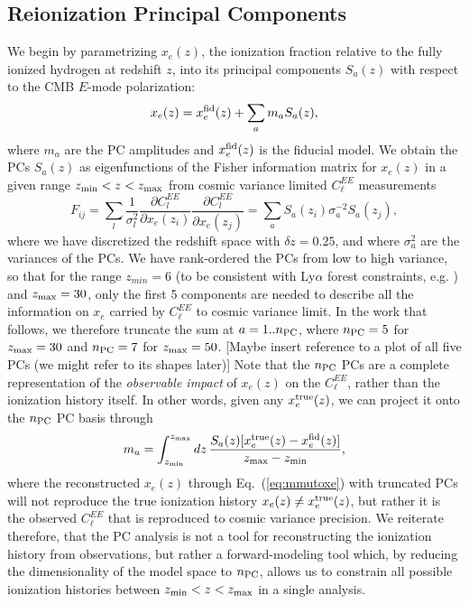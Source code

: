 \documentclass[prd,twocolumn,amsmath,amssymb,floatfix,superscriptaddress,nofootinbib]{revtex4-1}
\newcommand{\xef}{x_e^{\rm fid}}
\newcommand{\zmax}{z_{\rm max}}
\newcommand{\zmin}{z_{\rm min}}
\newcommand{\beq}{\begin{equation}}
\newcommand{\eeq}{\end{equation}}
\begin{document}
\subsection{Reionization Principal Components}
\label{sec:PC}
We begin by parametrizing $x_e(z)$, the ionization fraction relative to the fully ionized hydrogen at redshift $z$, into its principal components $S_{a}(z)$ with respect to the CMB $E$-mode polarization:
%
\begin{equation}
x_e(z)=\xef(z)+\sum_{a}m_{a}S_{a}(z),
\label{eq:mmutoxe}
\end{equation}
%
where $m_a$ are the PC amplitudes and $\xef(z)$ is the fiducial model. We obtain the PCs $S_{a}(z)$ as eigenfunctions of the Fisher information matrix for $x_e(z)$ in a given range $z_{\rm min}<z<z_{\rm max}$ from cosmic variance limited $C_\ell^{EE}$ measurements 
%
\beq
F_{ij} = \sum_l \frac{1}{\sigma_l^2} \frac{\partial C_l^{EE}}{\partial x_e(z_i)}\frac{\partial C_l^{EE}}{\partial x_e(z_j)} = \sum_a S_a(z_i) \sigma_a^{-2} S_a(z_j),
\eeq
%
where we have discretized the redshift space with $\delta z= 0.25$, and where $\sigma_a^2$ are the variances of the PCs. We have rank-ordered the PCs from low to high variance, so that for the range $z_{min} = 6$ (to be consistent with Ly$\alpha$ forest constraints, e.g. \cite{Becker:2015lua}) and $z_{\rm max} = 30$, only the first 5 components are needed to describe all the information on $x_e$ carried by $C_\ell^{EE}$ to cosmic variance limit. In the work that follows, we therefore truncate the sum at $a = 1 .. n_{\rm{PC}}$, where $n_{\rm{PC}} = 5$ for $z_{\rm max} = 30$ and $n_{\rm{PC}} = 7$ for $z_{\rm max} = 50$.
[Maybe insert reference to a plot of all five PCs (we might refer to its shapes later)]
Note that the $n_{\rm PC}$ PCs are a complete representation of the \textit{observable impact} of $x_e(z)$ on the $C_\ell^{EE}$, rather than the ionization history itself. In other words, 
given any $x_e^{\rm true}(z)$, we can project it onto the $n_{\rm PC}$ PC basis through
\begin{equation}
m_{a}=
  \int _{\zmin}^{\zmax} dz\, \frac{S_{a}(z) [x_e^{\rm true}(z)-\xef(z)]}{\zmax-\zmin},
\label{eq:xetommu}
\end{equation}
%
where the reconstructed $x_e(z)$ through Eq.~(\ref{eq:mmutoxe}) with truncated PCs will not reproduce the true ionization history $x_e(z) \neq x_e^{\rm true}(z)$, but rather it is the observed $C_\ell^{EE}$ that is reproduced to cosmic variance precision. We reiterate therefore, that the PC analysis is not a tool for reconstructing the ionization history from observations, but rather a forward-modeling tool which, by reducing the dimensionality of the model space to $n_{\rm PC}$, allows us to constrain all possible ionization histories between $z_{\rm min}<z<z_{\rm max}$ in a single analysis.
\end{document}
